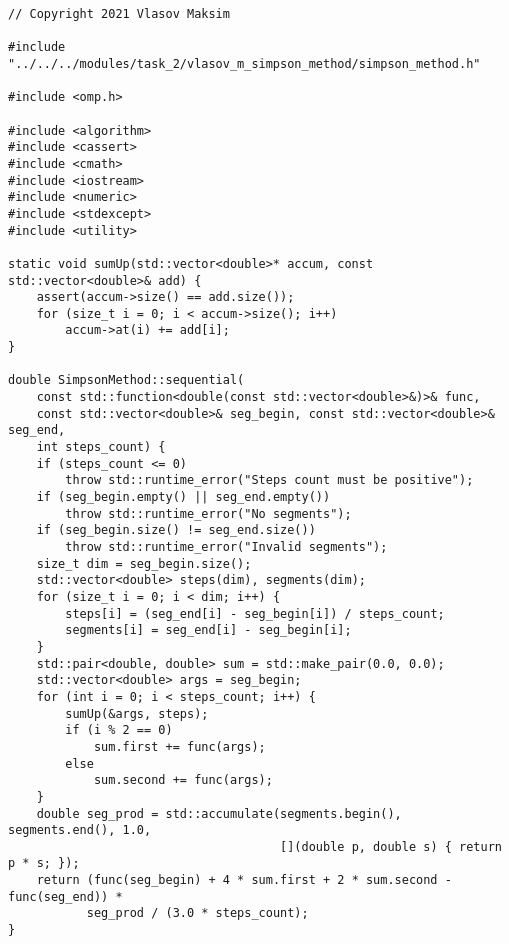 \documentclass{report}
\begin{document}
\begin{lstlisting}
// Copyright 2021 Vlasov Maksim

#include "../../../modules/task_2/vlasov_m_simpson_method/simpson_method.h"

#include <omp.h>

#include <algorithm>
#include <cassert>
#include <cmath>
#include <iostream>
#include <numeric>
#include <stdexcept>
#include <utility>

static void sumUp(std::vector<double>* accum, const std::vector<double>& add) {
    assert(accum->size() == add.size());
    for (size_t i = 0; i < accum->size(); i++)
        accum->at(i) += add[i];
}

double SimpsonMethod::sequential(
    const std::function<double(const std::vector<double>&)>& func,
    const std::vector<double>& seg_begin, const std::vector<double>& seg_end,
    int steps_count) {
    if (steps_count <= 0)
        throw std::runtime_error("Steps count must be positive");
    if (seg_begin.empty() || seg_end.empty())
        throw std::runtime_error("No segments");
    if (seg_begin.size() != seg_end.size())
        throw std::runtime_error("Invalid segments");
    size_t dim = seg_begin.size();
    std::vector<double> steps(dim), segments(dim);
    for (size_t i = 0; i < dim; i++) {
        steps[i] = (seg_end[i] - seg_begin[i]) / steps_count;
        segments[i] = seg_end[i] - seg_begin[i];
    }
    std::pair<double, double> sum = std::make_pair(0.0, 0.0);
    std::vector<double> args = seg_begin;
    for (int i = 0; i < steps_count; i++) {
        sumUp(&args, steps);
        if (i % 2 == 0)
            sum.first += func(args);
        else
            sum.second += func(args);
    }
    double seg_prod = std::accumulate(segments.begin(), segments.end(), 1.0,
                                      [](double p, double s) { return p * s; });
    return (func(seg_begin) + 4 * sum.first + 2 * sum.second - func(seg_end)) *
           seg_prod / (3.0 * steps_count);
}


\end{lstlisting}
\end{document}

